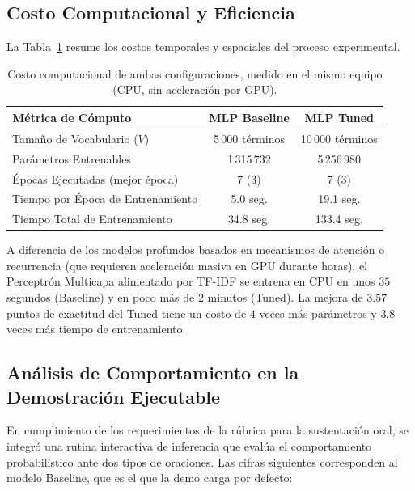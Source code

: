 \documentclass[12pt, a4paper]{article}
\begin{document}
\subsection{Costo Computacional y Eficiencia}

La Tabla~\ref{tab:computational_cost} resume los costos temporales y espaciales del proceso experimental.

\begin{table}[H]
    \centering
    \caption{Costo computacional de ambas configuraciones, medido en el mismo equipo (CPU, sin aceleración por GPU).}
    \label{tab:computational_cost}
    \begin{tabular}{@{}lcc@{}}
        \toprule
        \textbf{Métrica de Cómputo} & \textbf{MLP Baseline} & \textbf{MLP Tuned} \\
        \midrule
        Tamaño de Vocabulario ($V$)          & 5\,000 términos & 10\,000 términos \\
        Parámetros Entrenables               & 1\,315\,732      & 5\,256\,980 \\
        Épocas Ejecutadas (mejor época)      & 7 (3)          & 7 (3) \\
        Tiempo por Época de Entrenamiento    & 5.0 seg.       & 19.1 seg. \\
        Tiempo Total de Entrenamiento        & 34.8 seg.      & 133.4 seg. \\
        \bottomrule
    \end{tabular}
\end{table}

A diferencia de los modelos profundos basados en mecanismos de atención o recurrencia (que requieren aceleración masiva en GPU durante horas), el Perceptrón Multicapa alimentado por TF-IDF se entrena en CPU en unos $35$ segundos (Baseline) y en poco más de $2$ minutos (Tuned). La mejora de $3.57$ puntos de exactitud del Tuned tiene un costo de $4$ veces más parámetros y $3.8$ veces más tiempo de entrenamiento.

\subsection{Análisis de Comportamiento en la Demostración Ejecutable}

En cumplimiento de los requerimientos de la rúbrica para la sustentación oral, se integró una rutina interactiva de inferencia que evalúa el comportamiento probabilístico ante dos tipos de oraciones. Las cifras siguientes corresponden al modelo Baseline, que es el que la demo carga por defecto:
\end{document}
